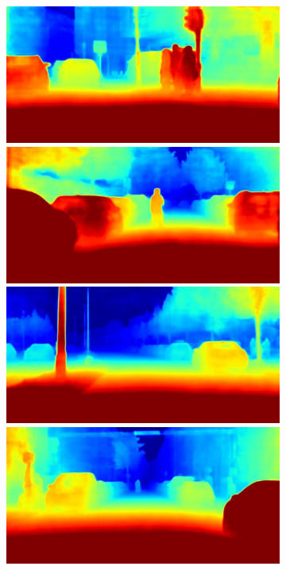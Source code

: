 {\begin{figure}[t]
{{\begin{subfigure}[t]{0.24\linewidth}
\begin{center}
		\includegraphics[width=\linewidth,trim={0px 60px 0 0px},clip]{qualitative/bielefeld_000000_018102_depth_prediction.jpg}
		\includegraphics[width=\linewidth,trim={0px 60px 0 0px},clip]{qualitative/bielefeld_000000_027586_depth_prediction.jpg}
		\includegraphics[width=\linewidth,trim={0px 60px 0 0px},clip]{qualitative/munich_000026_000019_depth_prediction.jpg}
		\includegraphics[width=\linewidth,trim={0px 60px 0 0px},clip]{qualitative/munich_000306_000019_depth_prediction.jpg}

\end{center}
\end{subfigure}}}
\end{figure}}
